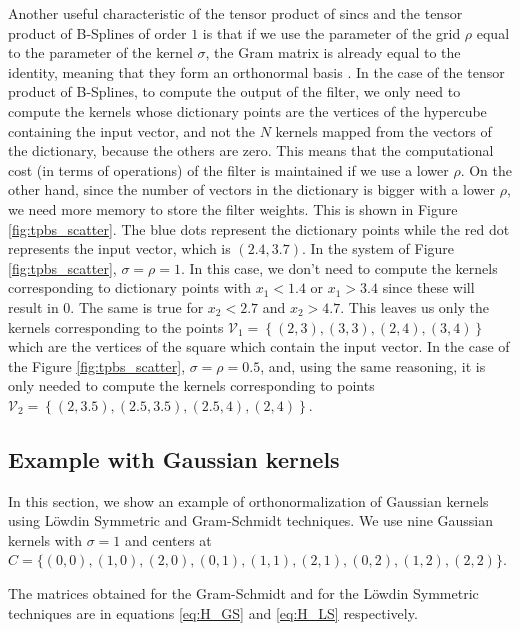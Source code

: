 Another useful characteristic of the tensor product of sincs and the tensor product of B-Splines of order $1$ is that if we use the parameter of the grid $\rho$ equal to the parameter of the kernel $\sigma$, the Gram matrix is already equal to the identity, meaning that they form an orthonormal basis \cite{horn_matrix_2017}. 
In the case of the tensor product of B-Splines, to compute the output of the filter, we only need to compute the kernels whose dictionary points are the vertices of the hypercube containing the input vector, and not the $N$ kernels mapped from the vectors of the dictionary, because the others are zero. This means that the computational cost (in terms of operations) of the filter is maintained if we use a lower $\rho$. On the other hand, since the number of vectors in the dictionary is bigger with a lower $\rho$, we need more memory to store the filter weights.
This is shown in Figure \ref{fig:tpbs_scatter}. The blue dots represent the dictionary points while the red dot represents the input vector, which is $(2.4,3.7)$. In the system of Figure \ref{fig:tpbs_scatter}, $\sigma = \rho = 1$. In this case, we don't need to compute the kernels corresponding to dictionary points with $x_1 < 1.4$ or $x_1 > 3.4$ since these will result in 0. The same is true for $x_2 < 2.7$ and $x_2 > 4.7$. This leaves us only the kernels corresponding to the points $\mathcal{V}_1 = \left\{(2,3),(3,3),(2,4),(3,4)\right\}$ which are the vertices of the square which contain the input vector.
In the case of the Figure \ref{fig:tpbs_scatter}, $\sigma = \rho = 0.5$, and, using the same reasoning, it is only needed to compute the kernels corresponding to points $\mathcal{V}_2 = \left\{(2,3.5),(2.5,3.5),(2.5,4),(2,4)\right\}$.


\subsection{Example with Gaussian kernels}

In this section, we show an example of orthonormalization of Gaussian kernels using Löwdin Symmetric and Gram-Schmidt techniques. We use nine Gaussian kernels with $\sigma = 1$ and 
centers at $C = \{(0,0),(1,0),(2,0),(0,1),(1,1),(2,1),(0,2),(1,2),(2,2)\}$. 

The matrices obtained for the Gram-Schmidt and for the Löwdin Symmetric techniques are in equations \eqref{eq:H_GS} and \eqref{eq:H_LS} respectively.

        
        

